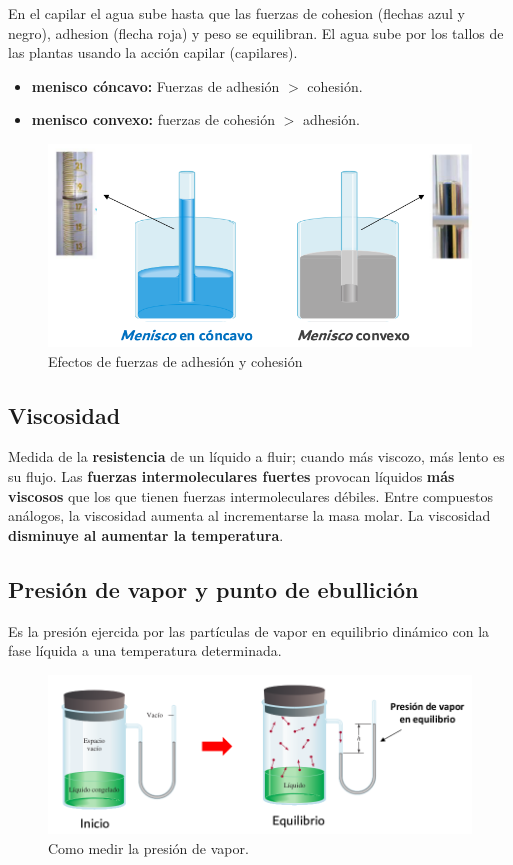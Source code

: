 \documentclass[]{article}
\begin{document}
En el capilar el agua sube hasta que las fuerzas de cohesion (flechas azul y negro), adhesion (flecha roja) y peso se equilibran. El agua sube por los tallos de las plantas usando la acción capilar (capilares). 

\begin{itemize}
	\item \textbf{menisco cóncavo:} Fuerzas de adhesión $>$ cohesión.
	\item \textbf{menisco convexo:} fuerzas de cohesión $>$ adhesión.
\end{itemize}

\begin{figure}[H]
\center
\includegraphics[scale=0.3]{foto12.png}
\caption{Efectos de fuerzas de adhesión y cohesión}
\end{figure}



\subsection{Viscosidad}
Medida de la \textbf{resistencia} de un líquido a fluir; cuando más viscozo, más lento es su flujo. Las \textbf{fuerzas intermoleculares fuertes} provocan líquidos \textbf{más viscosos} que los que tienen fuerzas intermoleculares débiles. Entre compuestos análogos, la viscosidad aumenta al incrementarse la masa molar. La viscosidad \textbf{disminuye al aumentar la temperatura}.



\subsection{Presión de vapor y punto de ebullición}
Es la presión ejercida por las partículas de vapor en equilibrio dinámico con la fase líquida a una temperatura determinada.

\begin{figure}[H]
\center
\includegraphics[scale=0.35]{foto13.png}
\caption{Como medir la presión de vapor.}
\end{figure}
\end{document}
